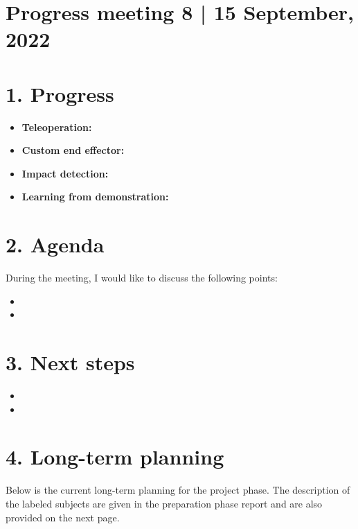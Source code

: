 \documentclass[11pt]{report}
\numberwithin{equation}{section}        %
\numberwithin{figure}{section}          %
\numberwithin{table}{section}           %
\begin{document}
  \section*{Progress meeting 8 | 15 September, 2022}


  \section*{1. Progress}
  \begin{itemize}
  \item \textbf{Teleoperation:} 
    
  \item \textbf{Custom end effector:} 
    
  \item \textbf{Impact detection:} 

  \item \textbf{Learning from demonstration:} 
    
  \end{itemize}

  \section*{2. Agenda}
  During the meeting, I would like to discuss the following points:

  \begin{itemize}
      \item  
      \item 
  \end{itemize}

  \section*{3. Next steps}

  \begin{itemize}
      \item  
      \item 
  \end{itemize}

  \section*{4. Long-term planning}
  Below is the current long-term planning for the project phase. The description of the labeled subjects are given in the preparation phase report and are also provided on the next page.
\end{document}
